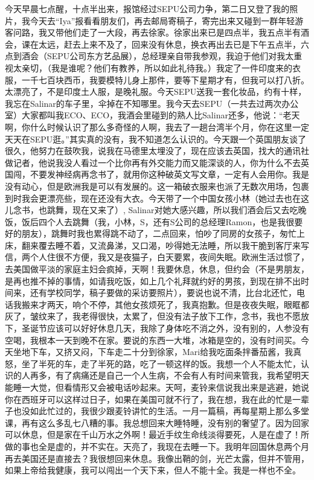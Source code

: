 \par {}
\par 今天早晨七点醒，十点半出来，报馆经过SEPU公司力争，第二日又登了我的照片，我今天去“Iya”报看看朋友们，再去邮局寄稿子，寄完出来又碰到一群年轻游客问路，我又带他们走了一大段，再去徐家。徐家出来已是四点半，我五点半有酒会，课在太远，赶去上来不及了，回来没有休息，换衣再出去已是下午五点半，六点到酒会（SEPU公司东方艺品展），总经理亲自带我参观，我迫于他们对我太重视太亲切，（我是谁呢？他们有教养，所以如此礼待我。）我定了一件印度来的衣服，一千七百块西币，我要模特儿身上那件，要等下星期才有，但我可以打八折。太漂亮了，不是印度土人服，是晚礼服。今天SEPU送我一套化妆品，约有十样，我忘在Salinar的车子里，伞掉在不知哪里。我今天去SEPU（一共去过两次办公室）大家都叫我ECO、ECO，我酒会里碰到的熟人比Salinar还多，他说：“老天啊，你什么时候认识了那么多奇怪的人啊，我去了一趟台湾半个月，你在这里一定天天在SEPU逛。”其实真的没有，我不知道怎么认识的。今天跟一个英国朋友谈了很久，他努力在鼓吹我，说我在马德里太埋没了，现在应该去英国，找大的通讯社做记者，他说我没人看过一个比你再有外交能力而又能深谈的人，你为什么不去英国闯，不要发神经病再念书了，就用你这种破英文写文章，一定有人会用你。我是没有动心，但是欧洲我是可以有发展的。这一箱破衣服来也派了无数次用场，包裹到时我会更漂亮些，现在还没有大衣。今天带了一个中国女孩小林（她过去也在这儿念书，也跳舞，现在又来了）, Salinar对她大感兴趣，所以我们酒会后又去吃晚饭，饭后四个人去跳舞（我，小林，S，还有S公司的总经理Ramon，也是我很要好的朋友），跳舞时我也累得跳不动了，二点回来，怕吵了同房的女孩子，匆忙上床，翻来覆去睡不着，又流鼻涕，又口渴，吵得她无法睡，所以我干脆到客厅来写信，两个人住很不方便，我又是夜猫子，白天要累，夜间失眠。欧洲生活过惯了，去美国做平淡的家庭主妇会疯掉，天啊！我要休息，休息，但约会（不是男朋友，是再也推不掉的事情，如请我吃饭，如上几个礼拜就约好的男孩，到现在排不出时间来，还有学校同学，稿子要做的采访要照片），要说也说不清，比台北还忙，电话我搬来才两天，响个不停，其他女孩烦死了，我真抱歉。但是夜夜失眠，眼眶都灰了，皱纹来了，我老得很快，太累了，但没有法子放下工作，念书，我也不愿放下，圣诞节应该可以好好休息几天，我除了身体吃不消之外，没有别的，人参没有空喝，我根本一天到晚不在家。要说的东西一大堆，冰箱是空的，没有时间买。今天坐地下车，又挤又闷，下车走二十分到徐家，Mari给我吃面条拌番茄酱，我真怒，坐了半死的车，走了半死的路，吃了一顿这样的饭。我想一个人不能太忙，认识的人再多，有了病痛还是自己一个人生病，不会有人有时间来管我，我希望明天能睡一大觉，但看情形又会被电话吵起来。天呵，麦铃来信说我出来是逃避，她说你在西班牙可以这样过日子，如果在美国可就不行了，我在想，我在此的忙是一辈子也没如此忙过的，我很少跟麦铃讲忙的生活。一月一篇稿，再每星期上那么多堂课，再有这么多乱七八糟的事。我总想回来大睡特睡，没有别的奢望了。因为回家可以休息，但是家在千山万水之外啊！最近手纹生命线淡得要死，人是在虚了！所做的事也全是虚的，并不实在。天亮了，我现在去睡一下。我明年回国休息两个月再去美国还是直接去？我很想回来休息。我像出鞘的剑，光芒太露，但并不管用，如果上帝给我健康，我可以闯出一个天下来，但人不能十全。我是一样也不全。
